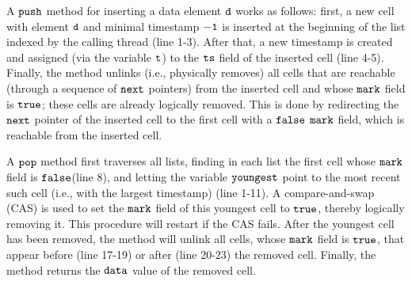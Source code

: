 A ${\tt push}$ method for inserting a data element ${\tt d}$ works as follows: first, a new cell with element ${\tt d}$ and minimal timestamp ${\tt -1}$ is inserted at the beginning of the list indexed by the calling thread (line 1-3). After that, a new timestamp is created and assigned (via the variable ${\tt t}$) to the ${\tt ts}$ field of the inserted cell (line 4-5).
Finally, the method unlinks (i.e., physically removes) all cells that are reachable (through a sequence of $\tt next$ pointers) from the inserted cell and whose ${\tt mark}$ field is ${\tt true}$; these cells are already logically removed. This is done by redirecting the $\tt next$ pointer of the inserted cell to the first cell with a ${\tt false}$ $\tt mark$ field, which is
reachable from the inserted cell.

A ${\tt pop}$ method first traverses all lists, finding in each list
the first cell whose ${\tt mark}$ field is ${\tt false}$(line 8), and letting the variable ${\tt youngest}$ point to the most recent such cell
(i.e., with the largest timestamp) (line 1-11).
A compare-and-swap (CAS) is used
to set the ${\tt mark}$ field of this youngest cell to ${\tt true}$,
thereby logically removing it.
This procedure will restart if the CAS fails. After the youngest cell has been removed, the method will unlink all cells, whose ${\tt mark}$ field is ${\tt true}$,
that appear before (line 17-19) or after (line 20-23) the removed cell.
Finally, the method returns the ${\tt data}$ value of the removed cell.


